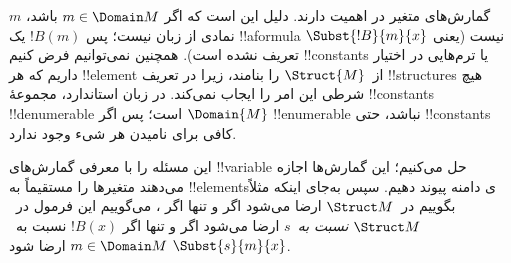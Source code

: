 \documentclass[../../../include/open-logic-section]{subfiles}
\begin{document}
\begin{explain}
گمارش‌های متغیر در
 اهمیت دارند. دلیل این است که اگر
$m \in \Domain M$ باشد، $m$ نمادی از زبان نیست؛ پس $!B(m)$ یک
!!a{formula} نیست (یعنی $\Subst{!B}{m}{x}$ تعریف نشده است). همچنین
نمی‌توانیم فرض کنیم !!{constant}s یا ترم‌هایی در اختیار داریم که هر
!!{element} از~$\Struct{M}$ را بنامند، زیرا در تعریف !!{structure}s هیچ
شرطی این امر را ایجاب نمی‌کند. در زبان استاندارد، مجموعهٔ !!{constant}s
!!{denumerable} است؛ پس اگر $\Domain{M}$ !!{enumerable} نباشد، حتی
!!{constant}s کافی برای نامیدن هر شیء وجود ندارد.

این مسئله را با معرفی گمارش‌های !!{variable} حل می‌کنیم؛ این گمارش‌ها
اجازه می‌دهند متغیرها را مستقیماً به !!{element}sی دامنه پیوند دهیم. سپس
به‌جای اینکه مثلاً بگوییم
 در~$\Struct M$
ارضا می‌شود اگر و تنها اگر ، می‌گوییم این فرمول در~$\Struct M$ \emph{نسبت
به}~$s$ ارضا می‌شود اگر و تنها اگر $!B(x)$ نسبت به~$\Subst{s}{m}{x}$
 $m \in \Domain M$ ارضا شود.
\end{explain}
\end{document}
